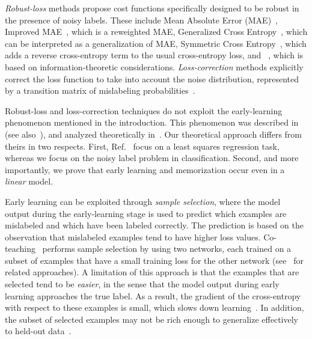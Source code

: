 \documentclass{article}
\newcommand{\1}{\mathds{1}}
\begin{document}
\emph{Robust-loss} methods propose cost functions specifically designed to be robust in the presence of noisy labels. These include Mean Absolute Error (MAE)~\citep{ghosh2017robust}, Improved MAE~\citep{wang2019imae}, which is a reweighted MAE, Generalized Cross Entropy~\citep{zhang2018generalized}, which can be interpreted as a generalization of MAE, Symmetric Cross Entropy~\citep{Wang2019SymmetricCE}, which adds a reverse cross-entropy term to the usual cross-entropy loss, and ~\citep{Xu2019L_DMIAN}, which is based on information-theoretic considerations. \emph{Loss-correction} methods explicitly correct the loss function to take into account the noise distribution, represented by a transition matrix of mislabeling probabilities~\citep{patrini2017making,Goldberger2017TrainingDN,xia2019anchor, tanno2019learning}. 

Robust-loss and loss-correction techniques do not exploit the early-learning phenomenon mentioned in the introduction. This phenomenon was described in~\citep{arpit2017closer} (see also~\citep{zhang2016understanding}), and analyzed theoretically in~\citep{li2019gradient}. Our theoretical approach differs from theirs in two respects. First, Ref.~\citep{li2019gradient} focus on a least squares regression task, whereas we focus on the noisy label problem in classification. Second, and more importantly, we prove that early learning and memorization occur even in a \emph{linear} model.

Early learning can be exploited through \emph{sample selection}, where the model output during the early-learning stage is used to predict which examples are mislabeled and which have been labeled correctly. The prediction is based on the observation that mislabeled examples tend to have higher loss values. Co-teaching~\citep{Han2018CoteachingRT,Yu2019HowDD} performs sample selection by using two networks, each trained on a subset of examples that have a small training loss for the other network (see~\citep{Jiang2018MentorNetLD,malach2017decoupling} for related approaches). A limitation of this approach is that the examples that are selected tend to be \emph{easier}, in the sense that the model output during early learning approaches the true label. As a result, the gradient of the cross-entropy with respect to these examples is small, which slows down learning~\citep{chang2017active}. In addition, the subset of selected examples may not be rich enough to generalize effectively to held-out data~\citep{song2019selfie}.
\end{document}
